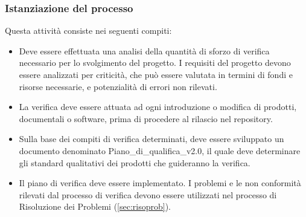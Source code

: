 \subsubsection{Istanziazione del processo}
Questa attività consiste nei seguenti compiti:
\begin{itemize}
    \item Deve essere effettuata una analisi della quantità di sforzo di verifica necessario per lo svolgimento del progetto. I requisiti del progetto devono essere analizzati per criticità, che può essere valutata in termini di fondi e risorse necessarie, e potenzialità di errori non rilevati.
    \item La verifica deve essere attuata ad ogni introduzione o modifica di prodotti, documentali o software, prima di procedere al rilascio nel repository. 
    \item Sulla base dei compiti di verifica determinati, deve essere sviluppato un documento denominato Piano\_di\_qualifica\_v2.0, il quale deve determinare gli standard qualitativi dei prodotti che guideranno la verifica.
    \item Il piano di verifica deve essere implementato. I problemi e le non conformità rilevati dal processo di verifica devono essere utilizzati nel processo di Risoluzione dei Problemi (\ref{sec:risoprob}).
\end{itemize}

